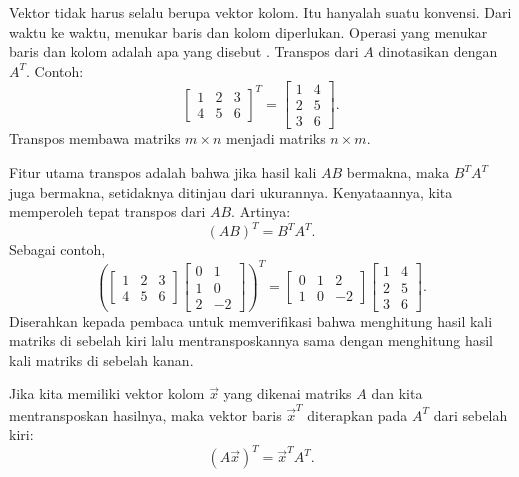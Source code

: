 Vektor tidak harus selalu berupa vektor kolom.
Itu hanyalah suatu konvensi.
Dari waktu ke waktu,
menukar baris dan kolom diperlukan.
Operasi yang menukar baris dan kolom adalah apa yang disebut
\emph{}.
Transpos dari $A$ dinotasikan dengan $A^T$. Contoh:
\begin{equation*}
\begin{bmatrix}
1 & 2 & 3 \\
4 & 5 & 6
\end{bmatrix}^T =
\begin{bmatrix}
1 & 4 \\
2 & 5 \\
3 & 6
\end{bmatrix} .
\end{equation*}
Transpos membawa matriks $m \times n$ menjadi matriks $n \times m$.

Fitur utama transpos adalah bahwa jika hasil kali $AB$ bermakna,
maka $B^TA^T$ juga bermakna, setidaknya ditinjau dari ukurannya.
Kenyataannya, kita memperoleh tepat transpos dari $AB$. Artinya:
\begin{equation*}
{(AB)}^T = B^TA^T .
\end{equation*}
Sebagai contoh,
\begin{equation*}
{\left(
\begin{bmatrix}
1 & 2 & 3 \\
4 & 5 & 6
\end{bmatrix}
\begin{bmatrix}
0 & 1 \\
1 & 0 \\
2 & -2
\end{bmatrix}
\right)}^T =
\begin{bmatrix}
0 & 1 & 2 \\
1 & 0 & -2
\end{bmatrix}
\begin{bmatrix}
1 & 4 \\
2 & 5 \\
3 & 6
\end{bmatrix} .
\end{equation*}
Diserahkan kepada pembaca untuk memverifikasi bahwa menghitung hasil kali matriks di
sebelah kiri lalu mentransposkannya sama dengan menghitung hasil kali matriks di
sebelah kanan.

Jika kita memiliki vektor kolom $\vec{x}$ yang dikenai matriks $A$
dan kita mentransposkan hasilnya,
maka vektor baris $\vec{x}^T$ diterapkan pada $A^T$ dari sebelah kiri:
\begin{equation*}
{(A\vec{x})}^T = \vec{x}^TA^T .
\end{equation*}

